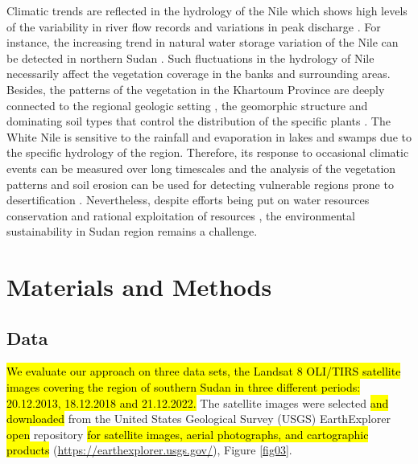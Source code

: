 \documentclass[jimaging,article,submit,pdftex,moreauthors]{Definitions/mdpi}
\begin{document}
Climatic trends are reflected in the hydrology of the Nile which shows high levels of the variability in river flow records \cite{CONWAY200599} and variations in peak discharge \cite{Babiker}. For instance, the increasing trend in natural water storage variation of the Nile can be detected in northern Sudan \cite{ABDELMALIK2019103596}. Such fluctuations in the hydrology of Nile necessarily affect the vegetation coverage in the banks and surrounding areas. Besides, the patterns of the vegetation in the Khartoum Province are deeply connected to the regional geologic setting \cite{ELSHEIKH201182}, the geomorphic structure and dominating soil types that control the distribution of the specific plants \cite{Mahmoud}. The White Nile is sensitive to the rainfall and evaporation in lakes and swamps due to the specific hydrology of the region. Therefore, its response to occasional climatic events can be measured over long timescales \cite{Sene} and the analysis of the vegetation patterns and soil erosion can be used for detecting vulnerable regions prone to desertification \cite{Bakhit}. Nevertheless, despite efforts being put on water resources conservation and rational exploitation of resources \cite{MOHAMEDALI2003237,w10111579}, the environmental sustainability in Sudan region remains a challenge.

 

\section{Materials and Methods}

\subsection{Data}

\hl{We evaluate our approach on three data sets, the Landsat 8 OLI/TIRS satellite images covering the region of southern Sudan in three different periods: 20.12.2013, 18.12.2018 and 21.12.2022. }The satellite images were selected \hl{and downloaded }from the United States Geological Survey (USGS) EarthExplorer \hl{open }repository \hl{for satellite images, aerial photographs, and cartographic products} (\href{https://earthexplorer.usgs.gov/}{https://earthexplorer.usgs.gov/}), Figure \ref{fig03}.
\end{document}
